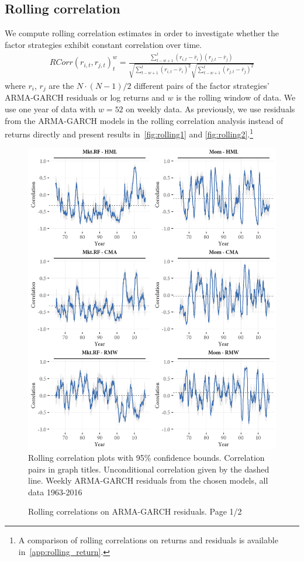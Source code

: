 \subsection{Rolling correlation}
\label{subsec:roll_corr}
We compute rolling correlation estimates in order to investigate whether the factor strategies exhibit constant correlation over time. 
\begin{align}
    RCorr(r_{i, t}, r_{j, t})_t^{w} = \frac{\sum^{t}_{t-w+1}(r_{i, t} - \bar{r}_i)(r_{j,t} - \bar{r}_j)}{\sqrt{\sum^{t}_{t-w+1} (r_{i,t} - \bar{r}_i)^2} \sqrt{\sum^{t}_{t-w+1} (r_{j,t} - \bar{r}_j)^2}}
\end{align}
where $r_i$, $r_j$ are the $N \cdot (N-1) / 2$ different pairs of the factor strategies' ARMA-GARCH residuals or log returns and $w$ is the rolling window of data. We use one year of data with $w = 52$ on weekly data. As previously, we use residuals from the ARMA-GARCH models in the rolling correlation analysis instead of returns directly and present results in~\autoref{fig:rolling1} and \autoref{fig:rolling2}.\footnote{A comparison of rolling correlations on returns and residuals is available in~\autoref{app:rolling_return}.}
\begin{figure}[htbp]
  \caption{Rolling correlations on ARMA-GARCH residuals. Page 1/2}
  \label{fig:rolling1}
  \centering
  \begin{minipage}{\textwidth}
  \includegraphics[scale=1]{graphics/rolling1.png}  
  \vspace{3mm}
  \footnotesize
  Rolling correlation plots with 95\% confidence bounds. Correlation pairs in graph titles. Unconditional correlation given by the dashed line. Weekly ARMA-GARCH residuals from the chosen models, all data 1963-2016
  \end{minipage}
\end{figure}
